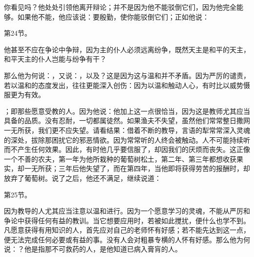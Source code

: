 你看见吗？他处处引领他离开辩论；并不是因为他不能驳倒它们，因为他完全能够。如果他不能，他应该说：要殷勤，使你能驳倒它们；正如他说：\par

第24节。\par

他甚至不应在争论中争辩，因为主的仆人必须远离纷争，既然天主是和平的天主，和平天主的仆人岂能与纷争有干？\par

\par

那么他为何说：，又说：，以及？这是因为这与温和并不矛盾。因为严厉的谴责，若以温和的态度发出，往往更能深入创伤：因为以温和触动人心，有时比以威势慑服更为有效。\par

；即那些愿意受教的人。因为他说：他加上这一点很恰当，因为这是教师尤其应当具备的品质。没有忍耐，一切都属徒然。如果渔夫不失望，虽然他们常常整日撒网一无所获，我们更不应失望。请看结果：借着不断的教导，言语的犁常常深入灵魂的深处，拔除那困扰它的邪恶情欲。因为常常听的人终会被触动。人不可能持续听而不产生任何效果。因此，有时他几乎要信服了，却因我们的厌烦而丧失。这正像一个不善的农夫，第一年为他所栽种的葡萄树松土，第二年、第三年都想收获果实，却一无所获；三年后他失望了，而在第四年，当他即将获得劳苦的报酬时，却放弃了葡萄树。说了之后，他还不满足，继续说道：\par

第25节。\par

因为教导的人尤其应当注意以温和进行。因为一个愿意学习的灵魂，不能从严厉和争论中获得任何有益的教训。当它想要应用时，若被如此搅扰，便什么也学不到。凡愿意获得有用知识的人，首先应对自己的老师怀有好感；若不能先达到这一点，便无法完成任何必要或有益的事。没有人会对粗暴专横的人怀有好感。那么他为何说：？他是指那不可救药的人，是他知道已病入膏肓的人。\par

\par


